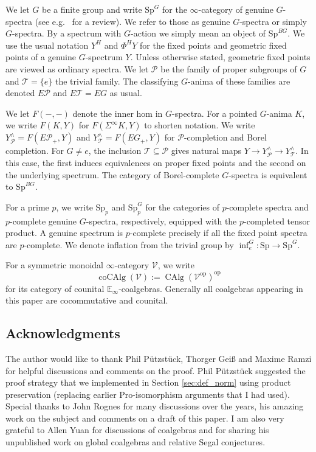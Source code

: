 \documentclass[11pt,a4paper]{article}
\theoremstyle{definition}
\newcommand{\Sp}{\mathrm{Sp}}
\newcommand{\SpG}{\mathrm{Sp}^{G}}
\newcommand{\Pp}{\mathcal P}
\newcommand{\Tt}{\mathcal T}
\newcommand{\EP}{E\mathcal P}
\newcommand{\op}{\mathrm{op}}
\newcommand{\coAlg}{\operatorname{coCAlg}}
\newcommand{\CAlg}{\operatorname{CAlg}}
\newcommand{\infl}{\operatorname{inf}}
\begin{document}
 We let $G$ be a finite group and write $\SpG$  for the $\infty$-category of
genuine $G$-spectra (see e.g.\ \cite[\S2]{Yuan} for a review). We refer to those as genuine $G$-spectra or simply $G$-spectra. By a spectrum with $G$-action we simply mean an object of $\Sp^{BG}$.
We use the usual notation $Y^H$ and $\Phi^H Y$ for the fixed points and geometric fixed points of a genuine $G$-spectrum $Y$. 
Unless otherwise stated, geometric fixed points are viewed as ordinary spectra. We let $\Pp$ be the family of proper subgroups of $G$ and
$\Tt=\{e\}$ the trivial family. The classifying $G$-anima of these families are denoted $E\Pp$ and $E\Tt = EG$ as usual.

We let $F(-,-)$ denote the inner hom in $G$-spectra. For a pointed $G$-anima $K$, we write
$F(K,Y)$ for $F(\Sigma^\infty K,Y)$ to shorten notation. We write 
$Y^\wedge_{\Pp}=F(\EP_+,Y)$ and $Y^\wedge_{\Tt}=F(EG_+,Y)$
for $\Pp$-completion and Borel completion. For $G\ne e$, the inclusion
$\Tt\subseteq\Pp$ gives natural maps
$
 Y\longrightarrow Y^\wedge_{\Pp}\longrightarrow Y^\wedge_{\Tt}.
$
In this case, the first induces equivalences on proper fixed points and the second on the underlying spectrum. The category of Borel-complete $G$-spectra is equivalent to $\Sp^{BG}$. 

For a prime $p$, we write $\Sp_p$ and $\Sp_p^G$ for the categories
of $p$-complete spectra and $p$-complete genuine $G$-spectra,
respectively, equipped with the $p$-completed tensor product. A genuine spectrum is $p$-complete precisely if all the fixed point spectra are $p$-complete.
We denote inflation from the trivial group by
$\infl_e^G:\Sp\to\SpG$.

For a symmetric monoidal $\infty$-category $\mathcal V$, we write
\[
 \coAlg(\mathcal V):=\CAlg(\mathcal V^{\op})^{\op}
\]
for its category of counital $\mathbb{E}_\infty$-coalgebras. Generally all coalgebras appearing in this paper are cocommutative and counital.

\subsection*{Acknowledgments} The author would like to thank Phil Pützstück, Thorger Gei\ss{} and Maxime Ramzi for helpful discussions and comments on the proof. Phil Pützstück suggested the proof strategy that we implemented in Section \ref{sec:def_norm} using product preservation (replacing earlier Pro-isomorphism arguments that I had used). 
Special thanks to John Rognes for many discussions over the years, his amazing work on the subject and comments on a draft of this paper. I am also very grateful to Allen Yuan for discussions of coalgebras and for  sharing his unpublished work on global coalgebras and relative Segal conjectures.
\end{document}
